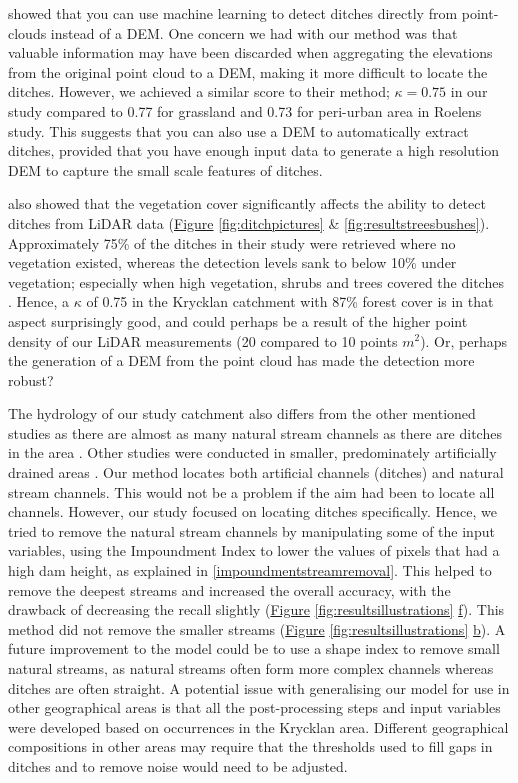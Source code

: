 \documentclass[]{interact}
\theoremstyle{plain}%
\theoremstyle{definition}
\theoremstyle{remark}
\begin{document}
\citet{roelens} showed that you can use machine learning to detect ditches directly from point-clouds instead of a DEM. One concern we had with our method was that valuable information may have been discarded when aggregating the elevations from the original point cloud to a DEM, making it more difficult to locate the ditches. However, we achieved a similar score to their method; $\kappa=0.75$ in our study compared to 0.77 for grassland and 0.73 for peri-urban area in Roelens study. This suggests that you can also use a DEM to automatically extract ditches, provided that you have enough input data to generate a high resolution DEM to capture the small scale features of ditches. 

\citet{bailly} also showed that the vegetation cover significantly affects the ability to detect ditches from LiDAR data (\hyperref[fig:ditchpictures]{Figure} \ref{fig:ditchpictures} \& \ref{fig:resultstreesbushes}). Approximately 75\% of the ditches in their study were retrieved where no vegetation existed, whereas the detection levels sank to below 10\% under vegetation; especially when high vegetation, shrubs and trees covered the ditches \citep{bailly}. Hence, a $\kappa$ of 0.75 in the Krycklan catchment with  87\% forest cover \citep{krycklancatchment} is in that aspect surprisingly good, and could perhaps be a result of the higher point density of our LiDAR measurements (20 compared to 10 points $m^{2}$). Or, perhaps the generation of a DEM from the point cloud has made the detection more robust?  

The hydrology of our study catchment also differs from the other mentioned studies as there are almost as many natural stream channels as there are ditches in the area \citep{hasselquist, mappingtemporal}. Other studies were conducted in smaller, predominately artificially drained areas \citep{roelens, bailly, rapinel}. Our method locates both artificial channels (ditches) and natural stream channels. This would not be a problem if the aim had been to locate all channels. However, our study focused on locating ditches specifically. Hence, we tried to remove the natural stream channels by manipulating some of the input variables, using the Impoundment Index to lower the values of pixels that had a high dam height, as explained in \ref{impoundmentstreamremoval}. This helped to remove the deepest streams and increased the overall accuracy, with the drawback of decreasing the recall slightly (\hyperref[fig:resultsillustrations]{Figure} \ref{fig:resultsillustrations} \hyperref[fig:resultsillustrations]{f}). This method did not remove the smaller streams (\hyperref[fig:resultsillustrations]{Figure} \ref{fig:resultsillustrations} \hyperref[fig:resultsillustrations]{b}). A future improvement to the model could be to use a shape index to remove small natural streams, as natural streams often form more complex channels whereas ditches are often straight. A potential issue with generalising our model for use in other geographical areas is that all the post-processing steps and input variables were developed based on occurrences in the Krycklan area. Different geographical compositions in other areas may require that the thresholds used to fill gaps in ditches and to remove noise would need to be adjusted.
\end{document}

